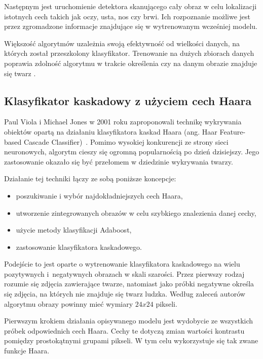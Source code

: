 Następnym jest uruchomienie detektora skanującego cały obraz w celu lokalizacji istotnych cech takich jak oczy, usta, nos czy brwi. Ich rozpoznanie możliwe jest przez zgromadzone informacje znajdujące się w wytrenowanym wcześniej modelu.

Większość algorytmów uzależnia swoją efektywność od wielkości danych, na których został przeszkolony klasyfikator. Trenowanie na dużych zbiorach danych poprawia zdolność algorytmu w trakcie określenia czy na danym obrazie znajduje się twarz \cite{fDetection}.


\subsection{Klasyfikator kaskadowy z użyciem cech Haara}
\label{sub:Haar}
Paul Viola i Michael Jones w 2001 roku zaproponowali technikę wykrywania obiektów opartą na działaniu klasyfikatora kaskad Haara (ang. Haar Feature-based Cascade Classifier)~\cite{haar}. Pomimo wysokiej konkurencji ze strony sieci neuronowych, algorytm cieszy się ogromną popularnością po dzień dzisiejszy. Jego zastosowanie okazało się być przełomem w dziedzinie wykrywania twarzy. 

Działanie tej techniki łączy ze sobą poniższe koncepcje:
\begin{itemize}
    \item poszukiwanie i wybór najdokładniejszych cech Haara,
    \item utworzenie zintegrowanych obrazów w celu szybkiego znalezienia danej cechy,
    \item użycie metody klasyfikacji Adaboost,
    \item zastosowanie klasyfikatora kaskadowego.
\end{itemize}

Podejście to jest oparte o wytrenowanie klasyfikatora kaskadowego na wielu pozytywnych i~negatywnych obrazach w skali szarości. Przez pierwszy rodzaj rozumie się zdjęcia zawierające twarze, natomiast jako próbki negatywne określa się zdjęcia, na których nie znajduje się twarz ludzka. Według zaleceń autorów algorytmu obrazy powinny mieć wymiary $24x24$ pikseli.

Pierwszym krokiem działania opisywanego modelu jest wydobycie ze wszystkich próbek odpowiednich cech Haara. Cechy te dotyczą zmian wartości kontrastu pomiędzy prostokątnymi grupami pikseli. W tym celu wykorzystuje się tak zwane funkcje Haara.

